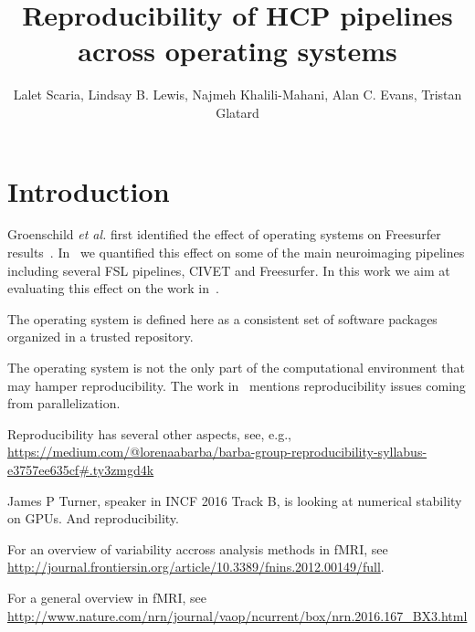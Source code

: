 \documentclass{article}
\title{Reproducibility of HCP pipelines across operating systems}
\author{Lalet Scaria, Lindsay B. Lewis, Najmeh Khalili-Mahani, Alan C. Evans, Tristan Glatard}
\begin{document}
\maketitle


\section{Introduction}

Groenschild \emph{et al.} first identified the effect of operating
systems on Freesurfer results~\cite{Gronenschild2012}. In~\cite{10.3389/fninf.2015.00012} 
we quantified this effect on some of the main neuroimaging pipelines
including several FSL pipelines, CIVET and Freesurfer. In this work we
aim at evaluating this effect on the work in~\cite{glasser2015multi}.

The operating system is defined here as a consistent set of software
packages organized in a trusted repository.

The operating system is not the only part of the computational
environment that may hamper reproducibility. The work
in~\cite{diethelm2012limits} mentions reproducibility issues coming
from parallelization.

Reproducibility has several other aspects, see, e.g.,
\url{https://medium.com/@lorenaabarba/barba-group-reproducibility-syllabus-e3757ee635cf#.ty3zmgd4k}

James P Turner, speaker in INCF 2016 Track B, is looking at numerical stability on GPUs. And reproducibility.

For an overview of variability accross analysis methods in fMRI, see \url{http://journal.frontiersin.org/article/10.3389/fnins.2012.00149/full}.

For a general overview in fMRI, see \url{http://www.nature.com/nrn/journal/vaop/ncurrent/box/nrn.2016.167_BX3.html}
\end{document}

